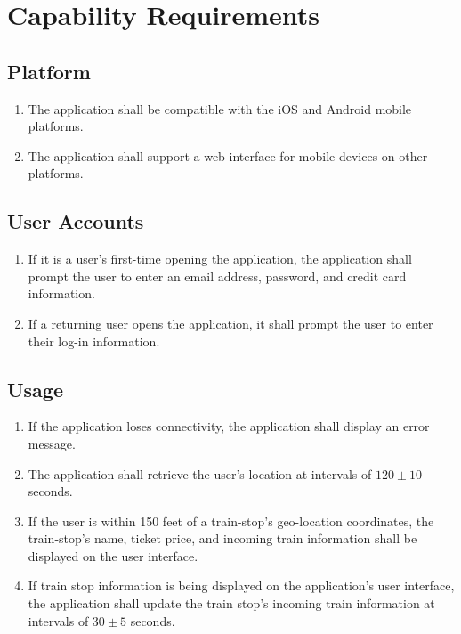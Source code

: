 \section{Capability Requirements}

	\subsection{Platform}\begin{frame}\begin{enumerate}
		\item The application shall be compatible with the iOS and Android mobile platforms.
		\item The application shall support a web interface for mobile devices on other platforms.
	\end{enumerate}\end{frame}
	
	\subsection{User Accounts}\begin{frame}\begin{enumerate}
		\item If it is a user’s first-time opening the application, the application shall prompt the user to enter an email address, password, and credit card information.
		\item If a returning user opens the application, it shall prompt the user to enter their log-in information.
	\end{enumerate}\end{frame}
	
	\subsection{Usage}\begin{frame}\begin{enumerate}
		\item If the application loses connectivity, the application shall display an error message. 
		\item The application shall retrieve the user’s location at intervals of $120\pm10$ seconds.
		\item If the user is within 150 feet of a train-stop’s geo-location coordinates, the train-stop’s name, ticket price, and incoming train information shall be displayed on the user interface.
		\item If train stop information is being displayed on the application’s user interface, the application shall update the train stop’s incoming train information at intervals of $30\pm 5$ seconds.
	\end{enumerate}\end{frame}
	
